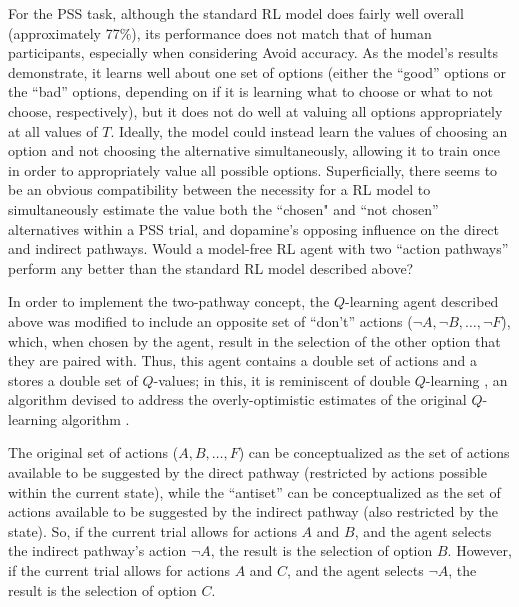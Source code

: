 \documentclass[10pt,letterpaper]{article}
\begin{document}
For the PSS task, although the standard RL model does fairly well overall (approximately 77\%), its performance does not match that of human participants, especially when considering Avoid accuracy. As the model's results demonstrate, it learns well about one set of options (either the ``good'' options or the ``bad'' options, depending on if it is learning what to choose or what to not choose, respectively), but it does not do well at valuing all options appropriately at all values of $T$. Ideally, the model could instead learn the values of choosing an option and not choosing the alternative simultaneously, allowing it to train once in order to appropriately value all possible options. Superficially, there seems to be an obvious compatibility between the necessity for a RL model to simultaneously estimate the value both the ``chosen" and ``not chosen'' alternatives within a PSS trial, and dopamine's opposing influence on the direct and indirect pathways. Would a model-free RL agent with two ``action pathways'' perform any better than the standard RL model described above?

In order to implement the two-pathway concept, the $Q$-learning agent described above was modified to include an opposite set of ``don't'' actions ($\neg A, \neg B, \dots, \neg F$), which, when chosen by the agent, result in the selection of the other option that they are paired with. Thus, this agent contains a double set of actions and a stores a double set of $Q$-values; in this, it is reminiscent of double $Q$-learning \cite{hasselt2010double,van2016deep}, an algorithm devised to address the overly-optimistic estimates of the original $Q$-learning algorithm \cite{watkins1992q}.

The original set of actions ($A, B, \dots, F$) can be conceptualized as the set of actions available to be suggested by the direct pathway (restricted by actions possible within the current state), while the ``antiset'' can be conceptualized as the set of actions available to be suggested by the indirect pathway (also restricted by the state). So, if the current trial allows for actions $A$ and $B$, and the agent selects the indirect pathway's action $\neg A$, the result is the selection of option $B$. However, if the current trial allows for actions $A$ and $C$, and the agent selects $\neg A$, the result is the selection of option $C$.
\end{document}
